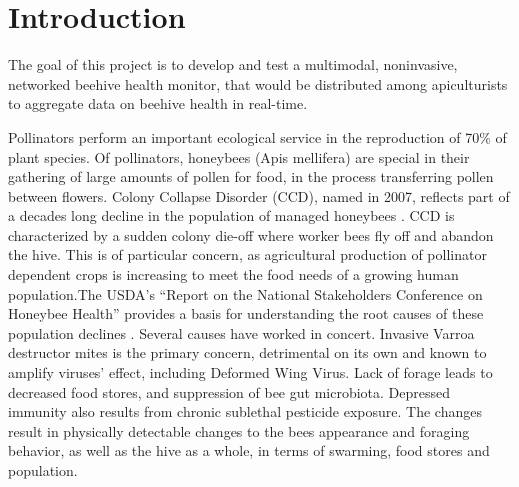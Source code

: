 
\section{Introduction}

The goal of this project is to develop and test a multimodal, noninvasive, networked beehive health monitor, that would be distributed among apiculturists to aggregate data on beehive health in real-time.

Pollinators perform an important ecological service in the reproduction of 70\% of plant species. Of pollinators, honeybees (Apis mellifera) are special in their gathering of large amounts of pollen for food, in the process transferring pollen between flowers. Colony Collapse Disorder (CCD), named in 2007, reflects part of a decades long decline in the population of managed honeybees \cite{spivak2010plight}. CCD is characterized by a sudden colony die-off where worker bees fly off and abandon the hive. This is of particular concern, as agricultural production of pollinator dependent crops is increasing to meet the food needs of a growing human population.The USDA’s “Report on the National Stakeholders Conference on Honeybee Health” provides a basis for understanding the root causes of these population declines \cite{national2012report}. Several causes have worked in concert. Invasive Varroa destructor mites is the primary concern, detrimental on its own and known to amplify viruses' effect, including Deformed Wing Virus. Lack of forage  leads to decreased food stores, and suppression of bee gut microbiota. Depressed immunity also results from chronic sublethal pesticide exposure. The changes result in physically detectable changes to the bees appearance and foraging behavior, as well as the hive as a whole, in terms of swarming, food stores and population. 


